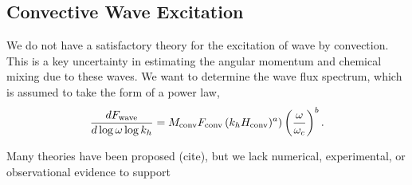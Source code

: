 {\color{purple}
\subsection{Convective Wave Excitation}
}

We do not have a satisfactory theory for the excitation of wave by convection. This is a key uncertainty in estimating the angular momentum and chemical mixing due to these waves. We want to determine the wave flux spectrum, which is assumed to take the form of a power law,
\begin{equation}
\frac{d F_{\rm wave}}{d\log \omega \log k_h} = M_{\rm conv}F_{\rm conv} \left(k_h H_{\rm conv})^{a}\right) \left(\frac{\omega}{\omega_c}\right)^{b}.
\end{equation}

Many theories have been proposed (cite), but we lack numerical, experimental, or observational evidence to support  
